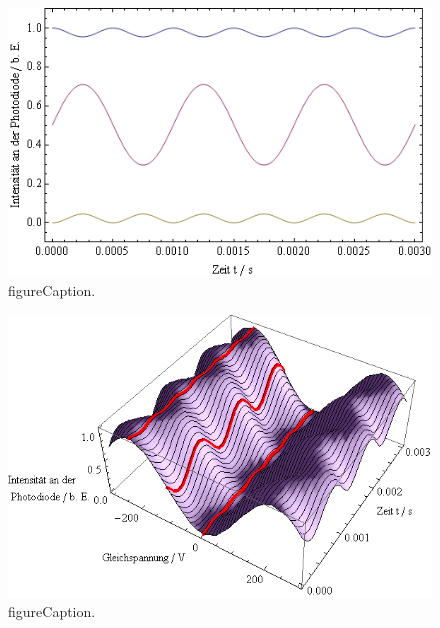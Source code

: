 \begin{figure}[H]
\begin{center}
  \includegraphics[width=\textwidth]{../img/Pocktheo2.png}
  \caption{figureCaption.}
  \label{img:pocktheo2}
\end{center}
\end{figure}

\begin{figure}[H]
\begin{center}
  \includegraphics[width=\textwidth]{../img/Pocktheo3.png}
  \caption{figureCaption.}
  \label{img:pocktheo3}
\end{center}
\end{figure}






